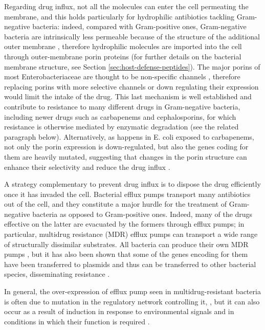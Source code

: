 Regarding drug influx, not all the molecules can enter the cell permeating the membrane, and this holds particularly for hydrophilic antibiotics tackling Gram-negative bacteria: indeed, compared with Gram-positive ones, Gram-negative bacteria are intrinsically less permeable because of the structure of the additional outer membrane \cite{Delcour2009}, therefore hydrophilic molecules are imported into the cell through outer-membrane porin proteins \cite{Vargiu2012,Kojima2013} (for further details on the bacterial membrane structure, see Section \ref{sec:host-defense-peptides}).
%
The major porins of most Enterobacteriaceae are thought to be non-specific channels \cite{Tran2013}, therefore replacing porins with more selective channels or down regulating their expression would limit the intake of the drug. This last mechanism is well established and contribute to resistance to many different drugs in Gram-negative bacteria, including newer drugs such as carbapenems and cephalosporins, for which resistance is otherwise mediated by enzymatic degradation \cite{Tamber2003,Baroud2013,Lavigne2013,Poulou2013,Wozniak2012} (see the related paragraph below).
Alternatively, as happens in E. coli exposed to carbapenems, not only the porin expression is down-regulated, but also the genes coding for them are heavily mutated, suggesting that changes in the porin structure can enhance their selectivity and reduce the drug influx \cite{Lavigne2013,Novais2012,Tangden2013}.

A strategy complementary to prevent drug influx is to dispose the drug efficiently once it has invaded the cell. Bacterial efflux pumps transport many antibiotics out of the cell, and they constitute a major hurdle for the treatment of Gram-negative bacteria as opposed to Gram-positive ones. Indeed, many of the drugs effective on the latter are evacuated by the formers through efflux pumps; in particular, multidrug resistance (MDR) efflux pumps can transport a wide range of structurally dissimilar substrates.
%
All bacteria can produce their own MDR pumps \cite{Floyd2010,Hu2012,Kim2013,Ogawa2012}, but it has also been shown that some of the genes encoding for them have been transferred to plasmids and thus can be transferred to other bacterial species, disseminating resistance \cite{Dolejska2013}.

In general, the over-expression of efflux pump seen in multidrug-resistant bacteria is often due to mutation in the regulatory network controlling it, \cite{Abouzeed2008}, but it can also occur as a result of induction in response to environmental signals and in conditions in which their function is required \cite{Baucheron2014,Nikaido2011,Hirakawa2004}.


